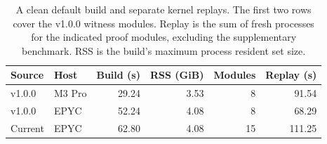 \begin{table}[t]
  \centering
  \caption{A clean default build and separate kernel replays. The first
    two rows cover the v1.0.0 witness modules. Replay is the sum of fresh
    processes for the indicated proof modules, excluding the supplementary
    benchmark. RSS is the build's maximum process resident set size.}
  \label{tab:platforms}
  \small
  \setlength{\tabcolsep}{3pt}
  \begin{tabular}{llrrrr}
    \toprule
    Source & Host & Build (s) & RSS (GiB) & Modules & Replay (s) \\
    \midrule
    v1.0.0 & M3 Pro & 29.24 & 3.53 & 8 & 91.54 \\
    v1.0.0 & EPYC   & 52.24 & 4.08 & 8 & 68.29 \\
    Current & EPYC  & 62.80 & 4.08 & 15 & 111.25 \\
    \bottomrule
  \end{tabular}
\end{table}
